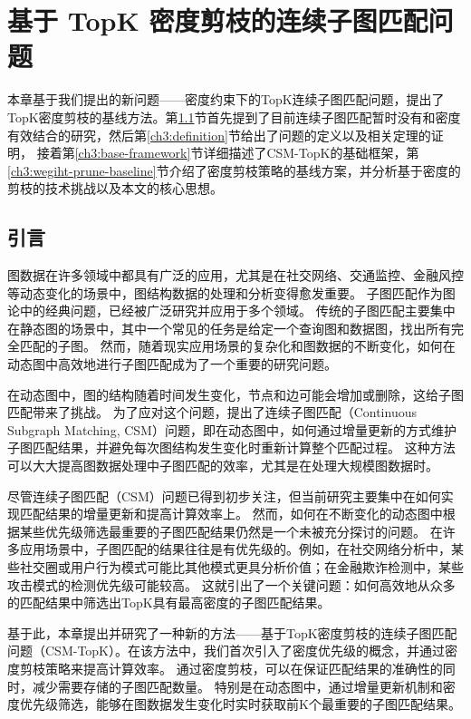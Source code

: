 \chapter{基于 TopK 密度剪枝的连续子图匹配问题}
\label{ch3}
本章基于我们提出的新问题——密度约束下的TopK连续子图匹配问题，提出了TopK密度剪枝的基线方法。第\ref{ch3:introduction}节首先提到了目前连续子图匹配暂时没有和密度有效结合的研究，然后第\ref{ch3:definition}节给出了问题的定义以及相关定理的证明，
接着第\ref{ch3:base-framework}节详细描述了CSM-TopK的基础框架，第\ref{ch3:wegiht-prune-baseline}节介绍了密度剪枝策略的基线方案，并分析基于密度的剪枝的技术挑战以及本文的核心思想。
\section{引言}
\label{ch3:introduction}
图数据在许多领域中都具有广泛的应用，尤其是在社交网络、交通监控、金融风控等动态变化的场景中，图结构数据的处理和分析变得愈发重要。
子图匹配作为图论中的经典问题，已经被广泛研究并应用于多个领域。
传统的子图匹配主要集中在静态图的场景中，其中一个常见的任务是给定一个查询图和数据图，找出所有完全匹配的子图。
然而，随着现实应用场景的复杂化和图数据的不断变化，如何在动态图中高效地进行子图匹配成为了一个重要的研究问题。

在动态图中，图的结构随着时间发生变化，节点和边可能会增加或删除，这给子图匹配带来了挑战。
为了应对这个问题，提出了连续子图匹配（Continuous Subgraph Matching, CSM）问题，即在动态图中，如何通过增量更新的方式维护子图匹配结果，并避免每次图结构发生变化时重新计算整个匹配过程。
这种方法可以大大提高图数据处理中子图匹配的效率，尤其是在处理大规模图数据时。

尽管连续子图匹配（CSM）问题已得到初步关注，但当前研究主要集中在如何实现匹配结果的增量更新和提高计算效率上。
然而，如何在不断变化的动态图中根据某些优先级筛选最重要的子图匹配结果仍然是一个未被充分探讨的问题。
在许多应用场景中，子图匹配的结果往往是有优先级的。例如，在社交网络分析中，某些社交圈或用户行为模式可能比其他模式更具分析价值；在金融欺诈检测中，某些攻击模式的检测优先级可能较高。
这就引出了一个关键问题：如何高效地从众多的匹配结果中筛选出TopK具有最高密度的子图匹配结果。

基于此，本章提出并研究了一种新的方法——基于TopK密度剪枝的连续子图匹配问题（CSM-TopK）。在该方法中，我们首次引入了密度优先级的概念，并通过密度剪枝策略来提高计算效率。
通过密度剪枝，可以在保证匹配结果的准确性的同时，减少需要存储的子图匹配数量。
特别是在动态图中，通过增量更新机制和密度优先级筛选，能够在图数据发生变化时实时获取前K个最重要的子图匹配结果。
